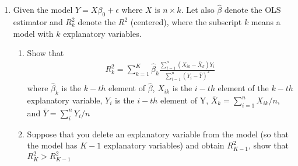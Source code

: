 \documentclass[12pt,onecolumn]{article}
\begin{document}
\begin{enumerate}
  \item Given the model $Y = X \beta_0 + \epsilon$ where $X$ is $n \times k$. Let also $\hat \beta$ denote the OLS estimator and $R^2_k$ denote the  $R^2$ (centered), where the subscript $k$ means a model with $k$ explanatory variables.
  \begin{enumerate}
    \item Show that 
    \begin{align}
      R^2_k = \sum_{k=1}^K \hat \beta_k \frac{\sum_{i=1}^n (X_{ik}-\bar{X}_k)Y_i}{\sum_{i=1}^n (Y_i-\bar Y)^2}
    \end{align}
    where $\hat \beta_k$ is the $k-th$ element of $\hat \beta$, $X_{ik}$ is the $i-th$ element of the $k-th$ explanatory variable, $Y_i$ is the $i-th$ element of Y, $\bar X_k = \sum_{i=1}^n X_{ik}/n$, and $\bar Y = \sum_i^n Y_i/n$
    \item Suppose that you delete an explanatory variable from the model (so that the model has $K-1$ explanatory variables) and obtain $R^2_{K-1}$, show that $R^2_{K}>R^2_{K-1}$
  \end{enumerate}



\end{enumerate}
\end{document}
